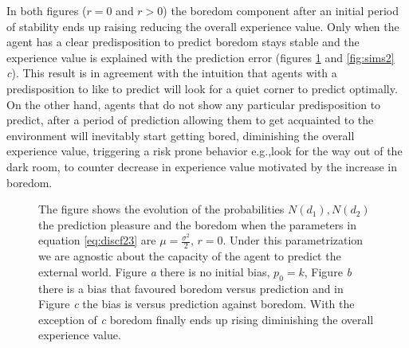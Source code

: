 \documentclass[11pt,twocolumn]{article}
\begin{document}
In both figures ($r=0$ and $r>0$) the boredom component after an initial period of stability ends up raising reducing the overall experience value. Only when the agent has a clear predisposition to predict boredom stays stable and the experience value is explained with the prediction error (figures \ref{fig:sims1} and \ref{fig:sims2} \emph{c}). This result is in agreement with the intuition that agents  with a predisposition to like to predict will look for a quiet corner to predict optimally. On the other hand, agents that do not show any particular predisposition to predict, after a period of prediction allowing them to get acquainted  to the environment will inevitably start getting bored, diminishing the overall experience value, triggering a risk prone behavior e.g.,look for the way out of the dark room, to counter decrease in experience value motivated by the increase in boredom. 

\begin{figure}[H]
    \subfigure[\label{subfig-1:dummy}]{%
      \texttt{[image: r=0k=s-inv.png]}
    }
    \hfill
    \subfigure[\label{subfig-2:dummy}]{%
      \texttt{[image: r=0k=10s-inv.png]}
    }
    \hfill
    \subfigure[\label{subfig-3:dummy}]{%
      \texttt{[image: r=0s=10k-inv.png]}
    }
    \caption{The figure shows the evolution of the probabilities $N(d_1), N(d_2)$ the prediction pleasure and the boredom when the parameters in equation \ref{eq:discf23} are $ \mu = \frac{\sigma ^2}{2}$, $r=0$. Under this parametrization we are agnostic about the capacity of the agent to predict the external world. Figure \emph{a} there is no initial bias, $p_0 = k$, Figure \emph{b} there is a bias that favoured boredom versus prediction and in Figure \emph{c} the bias is versus  prediction against boredom. With the exception of \emph{c} boredom finally ends up rising diminishing the overall experience value.}
    \label{fig:sims1}
\end{figure}
\end{document}
